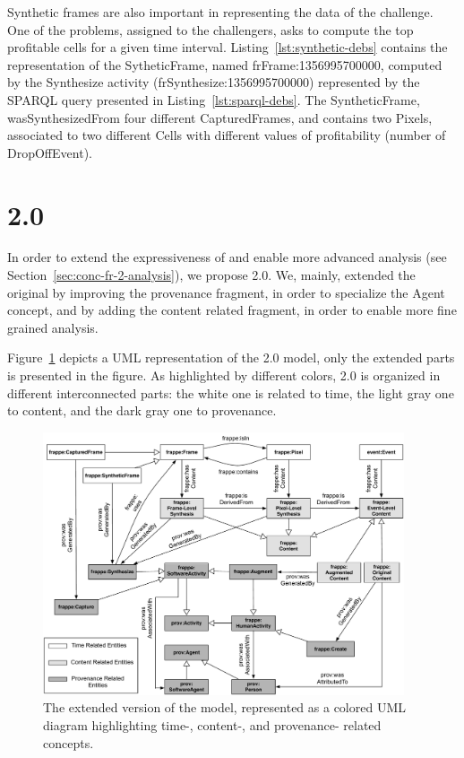 Synthetic frames are also important in representing the data of the challenge. One of the problems, assigned to the challengers, asks to compute the top profitable cells for a given time interval. Listing~\ref{lst:synthetic-debs} contains the representation of the \textsf{SytheticFrame}, named \textsf{frFrame:1356995700000}, computed by the \textsf{Synthesize} activity (\textsf{frSynthesize:1356995700000}) represented by the SPARQL query presented in Listing~\ref{lst:sparql-debs}. The \textsf{SyntheticFrame}, \textsf{wasSynthesizedFrom} four different \textsf{CapturedFrame}s, and contains two \textsf{Pixel}s, associated to two different \textsf{Cell}s with different values of profitability (number of \textsf{DropOffEvent}).

\section{\frappe{} 2.0} \label{sec:conc-fr-2}
In order to extend the expressiveness of \frappe{} and enable more advanced analysis (see Section~\ref{sec:conc-fr-2-analysis}), we propose \frappe{} 2.0.
We, mainly, extended the original \frappe{} by improving the provenance fragment, in order to specialize the \textsf{Agent} concept, and by adding the content related fragment, in order to enable more fine grained analysis. 

Figure~\ref{fig:extended-core} depicts a UML representation of the \frappe{} 2.0 model, only the extended parts is presented in the figure.
As highlighted by different colors, \frappe{} 2.0 is organized in different interconnected parts: the white one is related to time, the light gray one to content, and the dark gray one to provenance. 

\begin{figure}[t]
\centering
\includegraphics[width=0.95\textwidth]{img/conceptual-model-extended-core}
\caption{The extended version of the \frappe{} model, represented as a colored UML diagram highlighting time-, content-, and provenance- related concepts.}
\label{fig:extended-core}
\end{figure} 

